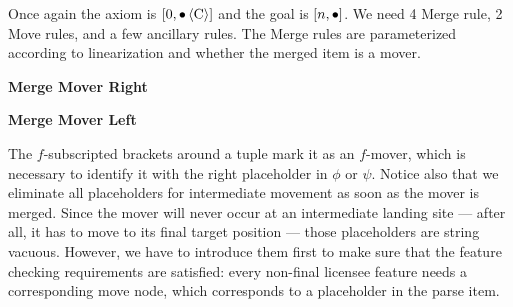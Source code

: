 Once again the axiom is $[0,\psep \ftuple{C}]$ and the goal is $[n,\psep]$.
We need 4 Merge rule, 2 Move rules, and a few ancillary rules.
The Merge rules are parameterized according to linearization and whether the merged item is a mover.
%
\begin{prooftree}
\end{prooftree}
%
\begin{prooftree}
\end{prooftree}
%
\noindent
\textbf{Merge Mover Right}
\begin{prooftree}
\end{prooftree}
%
\noindent
\textbf{Merge Mover Left}
\begin{prooftree}
\end{prooftree}
%
The $f$-subscripted brackets around a tuple mark it as an $f$-mover, which is necessary to identify it with the right placeholder in $\phi$ or $\psi$.
Notice also that we eliminate all placeholders for intermediate movement as soon as the mover is merged.
Since the mover will never occur at an intermediate landing site --- after all, it has to move to its final target position --- those placeholders are string vacuous.
However, we have to introduce them first to make sure that the feature checking requirements are satisfied: every non-final licensee feature needs a corresponding move node, which corresponds to a placeholder in the parse item.

